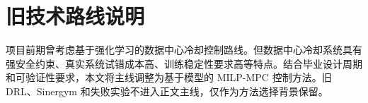 \documentclass[UTF8,a4paper,12pt]{ctexrep}
\begin{document}
\chapter{旧技术路线说明}

项目前期曾考虑基于强化学习的数据中心冷却控制路线。但数据中心冷却系统具有强安全约束、真实系统试错成本高、训练稳定性要求高等特点。结合毕业设计周期和可验证性要求，本文将主线调整为基于模型的 MILP-MPC 控制方法。旧 DRL、Sinergym 和失败实验不进入正文主线，仅作为方法选择背景保留。
\end{document}
